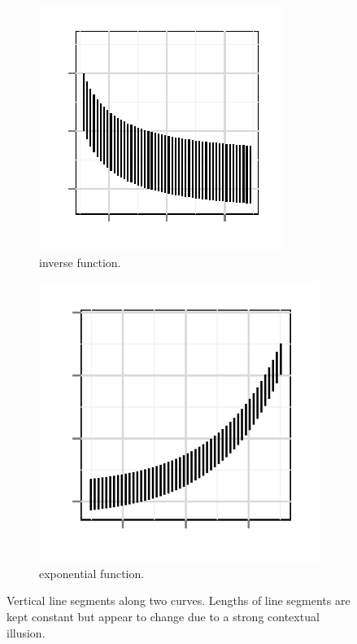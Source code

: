 \documentclass[journal]{vgtc}\usepackage{graphicx, color}
\begin{document}
\begin{figure}
\begin{subfigure}[b]{.49\linewidth}\centering
\includegraphics[width=\linewidth]{figure/fig-inverse}
\caption{inverse function.}\label{fig:stimuli.a}
\end{subfigure}
\begin{subfigure}[b]{.49\linewidth}\centering
\includegraphics[width=\linewidth]{figure/fig-exponential}
\caption{exponential function.}\label{fig:stimuli.b}
\end{subfigure}
\caption{\label{fig:stimuli} Vertical line segments along two curves. Lengths of line segments are kept constant but appear to change  due to a strong contextual illusion.}
\end{figure}
\end{document}
